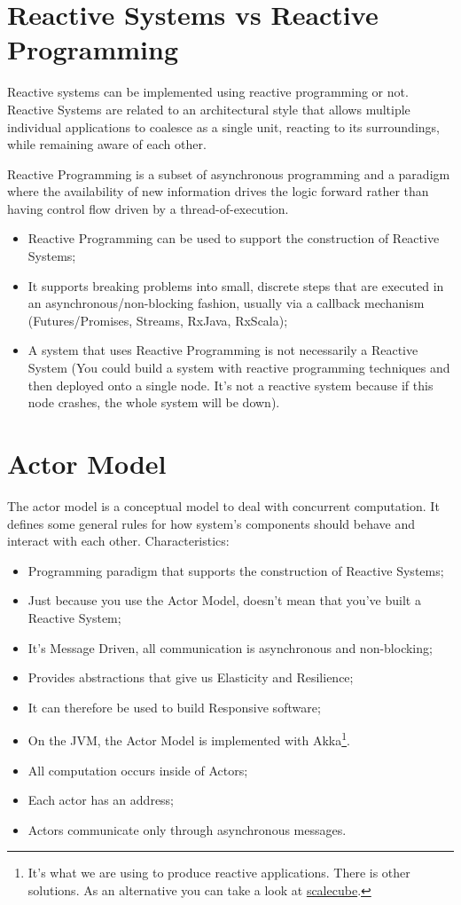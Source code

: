 \section{Reactive Systems vs Reactive Programming}
Reactive systems can be implemented using reactive programming or not. Reactive Systems are related to an architectural style that allows multiple individual applications to coalesce as a single unit, reacting to its surroundings, while remaining aware of each other. 

Reactive Programming is a subset of asynchronous programming and a paradigm where the availability of new information drives the logic forward rather than having control flow driven by a thread-of-execution.

\begin{itemize}
    \item Reactive Programming can be used to support the construction of Reactive Systems;
    \item It supports breaking problems into small, discrete steps that are executed in an asynchronous/non-blocking fashion, usually via a callback mechanism (Futures/Promises, Streams, RxJava, RxScala);
    \item A system that uses Reactive Programming is not necessarily a Reactive System (You could build a system with reactive programming techniques and then deployed onto a single node. It's not a reactive system because if this node crashes, the whole system will be down).
\end{itemize}

\section{Actor Model}
The actor model is a conceptual model to deal with concurrent computation. It defines some general rules for how system's components should behave and interact with each other. Characteristics:
\begin{itemize}
    \item Programming paradigm that supports the construction of Reactive Systems;
    \item Just because you use the Actor Model, doesn't mean that you've built a Reactive System;
    \item It's Message Driven, all communication is asynchronous and non-blocking;
    \item Provides abstractions that give us Elasticity and Resilience;
    \item It can therefore be used to build Responsive software;
    \item On the JVM, the Actor Model is implemented with Akka\footnote{It's what we are using to produce reactive applications. There is other solutions. As an alternative you can take a look at \href{http://scalecube.io/}{scalecube}.}.
    \item All computation occurs inside of Actors;
    \item Each actor has an address;
    \item Actors communicate only through asynchronous messages.
\end{itemize}

